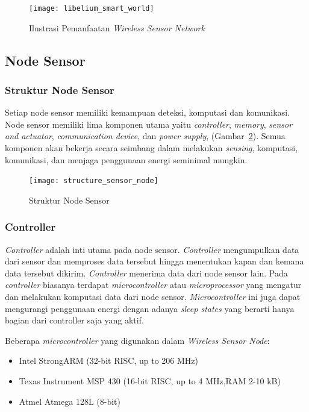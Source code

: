 \begin{figure} [H]
	\centering  
	\texttt{[image: libelium\_smart\_world]}  
	\caption[Ilustrasi Pemanfaatan \textit{Wireless Sensor Network}]{Ilustrasi Pemanfaatan \textit{Wireless Sensor Network}} 
	\label{fig:smartworld} 
\end{figure} 

\subsection{Node Sensor}
\subsubsection{Struktur Node Sensor}
Setiap node sensor memiliki kemampuan deteksi, komputasi dan komunikasi. Node sensor memiliki lima komponen utama yaitu \textit{controller}, \textit{memory}, \textit{sensor and actuator}, \textit{communication device}, dan \textit{power supply}, (Gambar~\ref{fig:structure_sensor_node}). Semua komponen akan bekerja secara seimbang dalam melakukan \textit{sensing}, komputasi, komunikasi, dan menjaga penggunaan energi seminimal mungkin. 

\begin{figure} [H]
	\centering  
	\texttt{[image: structure\_sensor\_node]}  
	\caption[Struktur Node Sensor]{Struktur Node Sensor} 
	\label{fig:structure_sensor_node} 
\end{figure} 

\subsubsection{Controller}
\textit{Controller} adalah inti utama pada node sensor. \textit{Controller} mengumpulkan data dari sensor dan memproses data tersebut hingga menentukan kapan dan kemana data tersebut dikirim. \textit{Controller} menerima data dari node sensor lain. Pada \textit{controller} biasanya terdapat \textit{microcontroller} atau \textit{microprocessor} yang mengatur dan melakukan komputasi data dari node sensor. \textit{Microcontroller} ini juga dapat mengurangi penggunaan energi dengan adanya \textit{sleep states} yang berarti hanya bagian dari controller saja yang aktif.

Beberapa \textit{microcontroller} yang digunakan dalam \textit{Wireless Sensor Node}:
\begin{itemize}
	\item Intel StrongARM (32-bit RISC, up to 206 MHz)
	\item Texas Instrument MSP 430 (16-bit RISC, up to 4 MHz,RAM 2-10 kB)
	\item Atmel Atmega 128L (8-bit)
\end{itemize}


